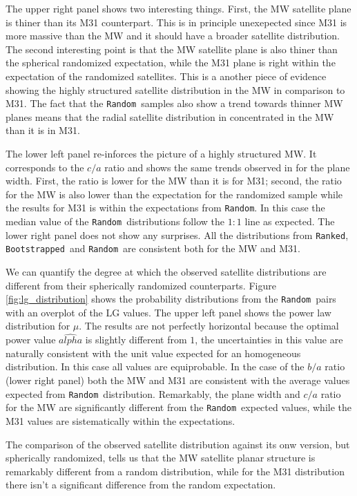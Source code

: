 \documentclass[a4paper,fleqn,usenatbib]{mnras}
\newcommand{\rank}{\texttt{Ranked}}
\newcommand{\boot}{\texttt{Bootstrapped}}
\newcommand{\rand}{\texttt{Random}}
\begin{document}
The upper right panel shows two interesting things. 
First, the MW satellite plane is thiner than its M31
counterpart. 
This is in principle unexepected since M31 is more
massive than the MW and it should have a broader satellite
distribution. 
The second interesting point is that the MW satellite plane is also
thiner than the spherical randomized expectation, while the M31 plane
is right within the expectation of the randomized satellites. 
This is a another piece of evidence showing the highly structured
satellite distribution in the MW in comparison to M31. 
The fact that the \rand\ samples also show a trend towards thinner MW
planes means that the radial satellite distribution in concentrated in
the MW than it is in M31.

The lower left panel re-inforces the picture of a highly structured
MW. 
It corresponds to the $c/a$ ratio and shows the same trends observed
in for the plane width. 
First, the ratio is lower for the MW than it is for M31; second, the
ratio for the MW is also lower than the expectation for the randomized
sample while the results for M31 is within the expectations from \rand.  
In this case the median value of the \rand\ distributions follow the
$1:1$ line as expected.
The lower right panel does not show any surprises. 
All the distributions from \rank, \boot\ and \rand\ are consistent
both for the MW and M31. 

We can quantify the degree at which the observed satellite distributions are 
different from their spherically randomized counterparts.
Figure \ref{fig:lg_distribution} shows the probability distributions
from the \rand\ pairs with an overplot of the LG values.
The upper left panel shows the power law distribution for $\mu$. The
results are not perfectly horizontal because the optimal power value
$\hat{alpha}$ is slightly different from $1$, the uncertainties in
this value are naturally consistent with the unit value expected for
an homogeneous distribution. 
In this case all values are equiprobable.
In the case of the $b/a$ ratio (lower right panel) both the MW and M31
are consistent with the average values expected from \rand\ distribution.
Remarkably, the plane width and $c/a$ ratio for the MW are significantly 
different from the \rand\ expected values, while the M31 values are
sistematically within the expectations.

The comparison of the observed satellite distribution against its onw
version, but spherically randomized, tells us that the MW satellite
planar structure is remarkably different from a random distribution,
while for the M31 distribution there isn't a significant difference
from the random expectation. 
\end{document}
